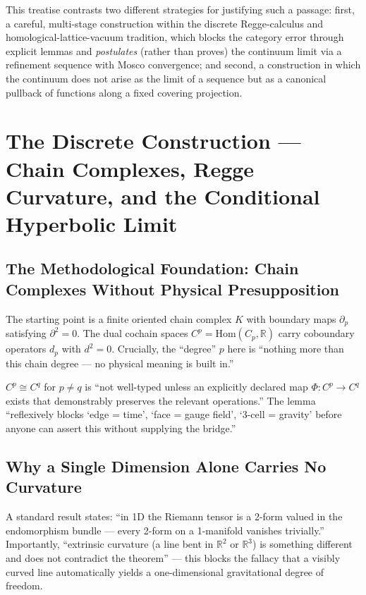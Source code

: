 This treatise contrasts two different strategies for justifying such a
passage: first, a careful, multi-stage construction within the discrete
Regge-calculus and homological-lattice-vacuum tradition, which blocks the
category error through explicit lemmas and \emph{postulates} (rather than
proves) the continuum limit via a refinement sequence with Mosco
convergence; and second, a construction in which the continuum does not
arise as the limit of a sequence but as a canonical pullback of functions
along a fixed covering projection.

\section{The Discrete Construction — Chain Complexes, Regge Curvature, and the Conditional Hyperbolic Limit}

\subsection{The Methodological Foundation: Chain Complexes Without Physical Presupposition}

The starting point is a finite oriented chain complex $K$ with boundary
maps $\partial_p$ satisfying $\partial^2=0$. The dual cochain spaces
$C^p=\mathrm{Hom}(C_p,\mathbb{R})$ carry coboundary operators $d_p$ with
$d^2=0$. Crucially, the ``degree'' $p$ here is ``nothing more than this
chain degree — no physical meaning is built in.''

\begin{kernbox}[title={Category-Error Block}]
$C^p\cong C^q$ for $p\neq q$ is ``not well-typed unless an explicitly
declared map $\Phi:C^p\to C^q$ exists that demonstrably preserves the
relevant operations.'' The lemma ``reflexively blocks `edge = time',
`face = gauge field', `3-cell = gravity' before anyone can assert this
without supplying the bridge.''
\end{kernbox}

\subsection{Why a Single Dimension Alone Carries No Curvature}

A standard result states: ``in 1D the Riemann tensor is a 2-form valued in
the endomorphism bundle — every 2-form on a 1-manifold vanishes
trivially.'' Importantly, ``extrinsic curvature (a line bent in
$\mathbb{R}^2$ or $\mathbb{R}^3$) is something different and does not
contradict the theorem'' — this blocks the fallacy that a visibly curved
line automatically yields a one-dimensional gravitational degree of
freedom.

